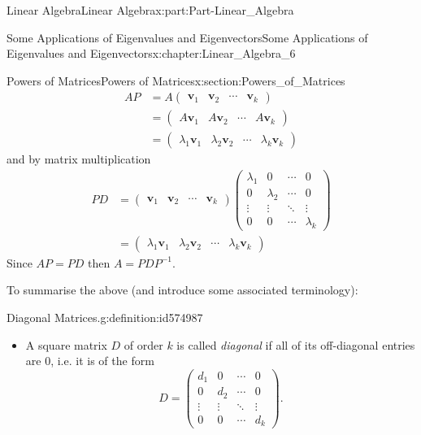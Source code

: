 \documentclass[oneside,10pt,]{book}
\numberwithin{equation}{section}
\newcommand{\bm}[1]{\boldsymbol{#1}}
\newcommand{\amp}{&}
\begin{document}
\begin{partptx}{Linear Algebra}{}{Linear Algebra}{}{}{x:part:Part-Linear_Algebra}
\begin{chapterptx}{Some Applications of Eigenvalues and Eigenvectors}{}{Some Applications of Eigenvalues and Eigenvectors}{}{}{x:chapter:Linear_Algebra_6}
\begin{sectionptx}{Powers of Matrices}{}{Powers of Matrices}{}{}{x:section:Powers_of_Matrices}
\begin{align*}
AP \amp = A \begin{pmatrix} \bm{v}_1 \amp \bm{v}_2 \amp \cdots \amp \bm{v}_k \end{pmatrix}\\
\amp = \begin{pmatrix} A\bm{v}_1 \amp A\bm{v}_2 \amp \cdots \amp A\bm{v}_k \end{pmatrix}\\
\amp = \begin{pmatrix} \lambda_1 \bm{v}_1 \amp \lambda_2 \bm{v}_2 \amp \cdots \amp \lambda_k \bm{v}_k \end{pmatrix}
\end{align*}
and by matrix multiplication%
\begin{align*}
PD \amp = \begin{pmatrix} \bm{v}_1 \amp \bm{v}_2 \amp \cdots \amp \bm{v}_k \end{pmatrix} \begin{pmatrix}
\lambda_1 \amp 0 \amp \cdots \amp 0 \\
0 \amp \lambda_2 \amp \cdots \amp 0 \\
\vdots \amp \vdots \amp \ddots \amp \vdots \\
0 \amp 0 \amp \cdots \amp \lambda_k
\end{pmatrix}\\
\amp = \begin{pmatrix} \lambda_1 \bm{v}_1 \amp \lambda_2 \bm{v}_2 \amp \cdots \amp \lambda_k \bm{v}_k \end{pmatrix}
\end{align*}
Since \(AP = PD\) then \(A = PDP^{-1}\).%
\par
To summarise the above (and introduce some associated terminology):%
\begin{definition}{Diagonal Matrices.}{g:definition:id574987}%
%
\begin{itemize}[label=\textbullet]
\item{}A  square  matrix  \(D\)  of  order  \(k\)  is  called  \emph{diagonal} if  all  of  its  off-diagonal  entries are 0, i.e. it is of the form%
\begin{equation*}
D = \begin{pmatrix} 
d_1 \amp 0 \amp \cdots \amp 0 \\
0 \amp d_2 \amp \cdots \amp 0 \\
\vdots \amp \vdots \amp \ddots \amp \vdots \\
0 \amp 0 \amp \cdots \amp d_k
\end{pmatrix}\text{.}

\end{equation*}
\end{itemize}
\end{definition}
\end{sectionptx}
\end{chapterptx}
\end{partptx}
\end{document}
